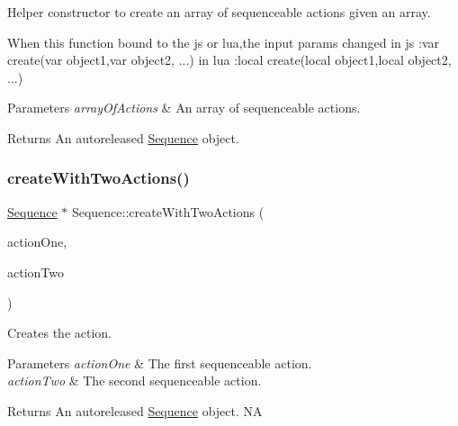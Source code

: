 Helper constructor to create an array of sequenceable actions given an array. 
\begin{DoxyCode}
When \textcolor{keyword}{this} \textcolor{keyword}{function} bound to the js or lua,the input params changed
in js  :var   create(var   object1,var   object2, ...)
in lua :local create(local object1,local object2, ...)
\end{DoxyCode}



\begin{DoxyParams}{Parameters}
{\em array\+Of\+Actions} & An array of sequenceable actions. \\
\hline
\end{DoxyParams}
\begin{DoxyReturn}{Returns}
An autoreleased \hyperlink{classSequence}{Sequence} object. 
\end{DoxyReturn}
\mbox{\label{classSequence_aa513abc4dc83fd38844537bf3412c0f9}} 
\subsubsection{\texorpdfstring{create\+With\+Two\+Actions()}{createWithTwoActions()}\hspace{0.1cm}{\footnotesize\ttfamily [1/2]}}
{\footnotesize\ttfamily \hyperlink{classSequence}{Sequence} $\ast$ Sequence\+::create\+With\+Two\+Actions (\begin{DoxyParamCaption}\item[{\hyperlink{classFiniteTimeAction}{Finite\+Time\+Action} $\ast$}]{action\+One,  }\item[{\hyperlink{classFiniteTimeAction}{Finite\+Time\+Action} $\ast$}]{action\+Two }\end{DoxyParamCaption})\hspace{0.3cm}{\ttfamily [static]}}

Creates the action. 
\begin{DoxyParams}{Parameters}
{\em action\+One} & The first sequenceable action. \\
\hline
{\em action\+Two} & The second sequenceable action. \\
\hline
\end{DoxyParams}
\begin{DoxyReturn}{Returns}
An autoreleased \hyperlink{classSequence}{Sequence} object.  NA 
\end{DoxyReturn}
\mbox{\label{classSequence_ade83fc0733cdc510445af7274e03c6b3}} 
